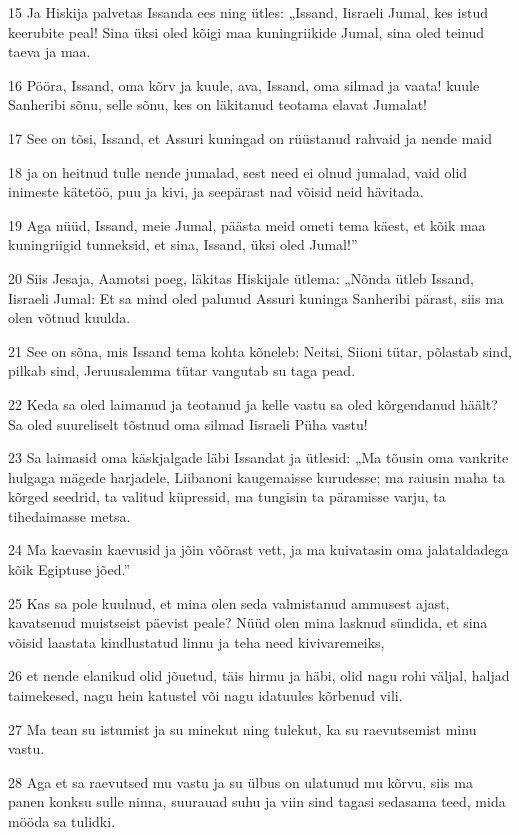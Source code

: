 \par 15 Ja Hiskija palvetas Issanda ees ning ütles: „Issand, Iisraeli Jumal, kes istud keerubite peal! Sina üksi oled kõigi maa kuningriikide Jumal, sina oled teinud taeva ja maa.
\par 16 Pööra, Issand, oma kõrv ja kuule, ava, Issand, oma silmad ja vaata! kuule Sanheribi sõnu, selle sõnu, kes on läkitanud teotama elavat Jumalat!
\par 17 See on tõsi, Issand, et Assuri kuningad on rüüstanud rahvaid ja nende maid
\par 18 ja on heitnud tulle nende jumalad, sest need ei olnud jumalad, vaid olid inimeste kätetöö, puu ja kivi, ja seepärast nad võisid neid hävitada.
\par 19 Aga nüüd, Issand, meie Jumal, päästa meid ometi tema käest, et kõik maa kuningriigid tunneksid, et sina, Issand, üksi oled Jumal!”
\par 20 Siis Jesaja, Aamotsi poeg, läkitas Hiskijale ütlema: „Nõnda ütleb Issand, Iisraeli Jumal: Et sa mind oled palunud Assuri kuninga Sanheribi pärast, siis ma olen võtnud kuulda.
\par 21 See on sõna, mis Issand tema kohta kõneleb: Neitsi, Siioni tütar, põlastab sind, pilkab sind, Jeruusalemma tütar vangutab su taga pead.
\par 22 Keda sa oled laimanud ja teotanud ja kelle vastu sa oled kõrgendanud häält? Sa oled suureliselt tõstnud oma silmad Iisraeli Püha vastu!
\par 23 Sa laimasid oma käskjalgade läbi Issandat ja ütlesid: „Ma tõusin oma vankrite hulgaga mägede harjadele, Liibanoni kaugemaisse kurudesse; ma raiusin maha ta kõrged seedrid, ta valitud küpressid, ma tungisin ta päramisse varju, ta tihedaimasse metsa.
\par 24 Ma kaevasin kaevusid ja jõin võõrast vett, ja ma kuivatasin oma jalataldadega kõik Egiptuse jõed.”
\par 25 Kas sa pole kuulnud, et mina olen seda valmistanud ammusest ajast, kavatsenud muistseist päevist peale? Nüüd olen mina lasknud sündida, et sina võisid laastata kindlustatud linnu ja teha need kivivaremeiks,
\par 26 et nende elanikud olid jõuetud, täis hirmu ja häbi, olid nagu rohi väljal, haljad taimekesed, nagu hein katustel või nagu idatuules kõrbenud vili.
\par 27 Ma tean su istumist ja su minekut ning tulekut, ka su raevutsemist minu vastu.
\par 28 Aga et sa raevutsed mu vastu ja su ülbus on ulatunud mu kõrvu, siis ma panen konksu sulle ninna, suurauad suhu ja viin sind tagasi sedasama teed, mida mööda sa tulidki.
